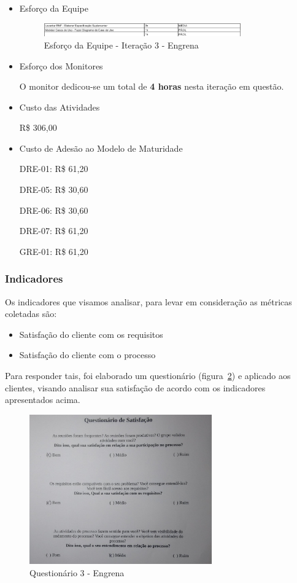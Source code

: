 \begin{itemize}
\item Esforço da Equipe

\begin{figure}[H]
    \center
    \includegraphics[width=0.8\textwidth]{figuras/esforco-eqp5}
    \caption{Esforço da Equipe - Iteração 3 - Engrena}
    \label{fig:esforco-eqp5}
\end{figure}

\item Esforço dos Monitores

O monitor dedicou-se um total de \textbf{4 horas} nesta iteração em questão.

\item Custo das Atividades

R\$ 306,00

\item Custo de Adesão ao Modelo de Maturidade

DRE-01: R\$ 61,20

DRE-05: R\$ 30,60

DRE-06: R\$ 30,60

DRE-07: R\$ 61,20

GRE-01: R\$ 61,20

\end{itemize}

\subsubsection{Indicadores}

Os indicadores que visamos analisar, para levar em consideração as métricas coletadas são:
\begin{itemize}
\item Satisfação do cliente com os requisitos
\item Satisfação do cliente com o processo
\end{itemize}

Para responder tais, foi elaborado um questionário (figura~\ref{fig:quest5}) e aplicado aos clientes, visando analisar sua satisfação de acordo com os indicadores apresentados acima.

\begin{figure}[H]
  \center
  \includegraphics[width=0.7\textwidth]{figuras/quest5}
  \caption{Questionário 3 - Engrena}
  \label{fig:quest5}
\end{figure}

